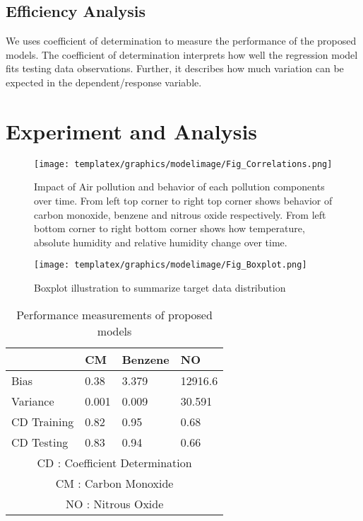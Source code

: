 \subsection{Efficiency Analysis}

We uses coefficient of determination to measure the performance of the proposed models. 
The coefficient of determination interprets how well the regression model fits testing data observations.
Further, it describes how much variation can be expected in the dependent/response variable.

\section{Experiment and Analysis} \label{sec-experiment}

\begin{figure*}[hbt!]
\centering
\texttt{[image: templatex/graphics/modelimage/Fig\_Correlations.png]}
\caption{Impact of Air pollution and behavior of each pollution components over time. From left top corner to right top corner shows behavior of carbon monoxide, benzene and nitrous oxide respectively. From left bottom corner to right bottom corner shows how temperature, absolute humidity and relative humidity change over time.}

\label{Fig_Impact}
\end{figure*}

\begin{figure*}[hbt!]
\centering
\texttt{[image: templatex/graphics/modelimage/Fig\_Boxplot.png]}
\caption{Boxplot illustration to summarize target data distribution}

\label{Fig_boxplot}
\end{figure*}
\begin{table}  
\centering
  \caption{Performance measurements of proposed models}
  \label{tbl:overall-experiments}
  \begin{tabular}{p{2cm}p{1cm}p{1cm}p{1cm}}
\toprule
    & CM & Benzene &NO \\
\midrule
    Bias & 0.38 & 3.379 & 12916.6 \\
    Variance & 0.001 & 0.009 & 30.591 \\
    CD Training & 0.82 & 0.95 & 0.68 \\
    CD Testing & 0.83 & 0.94 & 0.66 \\
\bottomrule
\multicolumn{4}{c}{CD : Coefficient Determination  }\\
\multicolumn{4}{c}{CM : Carbon Monoxide }\\
\multicolumn{4}{c}{NO : Nitrous Oxide}\\
\end{tabular}
\end{table}


